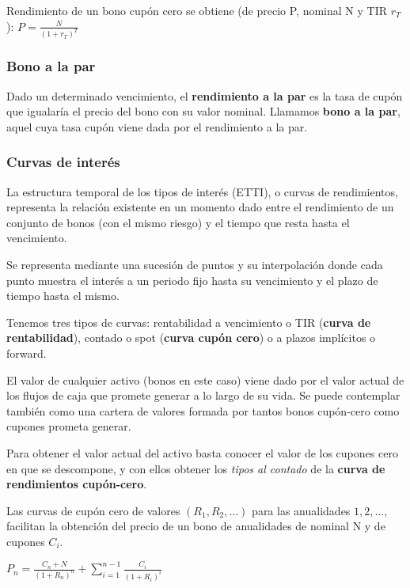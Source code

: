 \documentclass[
10pt, %
a4paper, %
oneside, %
headinclude,footinclude, %
BCOR5mm, %
]{scrartcl}
\newcommand{\n}[1]{\textbf{#1}}
\newcommand{\cur}[1]{\textit{#1}}
\newcommand{\sub}[1]{_{#1}}
\newcommand{\pot}[1]{^{#1}}
\newcommand{\f}[1]{{\large{${#1}$}}}
\newcommand{\sumatorio}[2]{\sum_{#1}^{#2}}
\newcounter{ex}
\begin{document}
		Rendimiento de un bono cupón cero se obtiene (de precio P, nominal N y TIR \f{r\sub{T}}): \f{P = \frac{N}{(1+r\sub{T})\pot{T}}}
		
		\subsubsection{Bono a la par}

		Dado un determinado vencimiento, el \n{rendimiento a la par} es la tasa de cupón que igualaría el precio del bono con su valor nominal. Llamamos \n{bono a la par}, aquel cuya tasa cupón viene dada por el rendimiento a la par.

		\subsubsection{Curvas de interés}

			La estructura temporal de los tipos de interés (ETTI), o curvas de rendimientos, representa la relación existente en un momento dado entre el rendimiento de un conjunto de bonos (con el mismo riesgo) y el tiempo que resta hasta el vencimiento.

			Se representa mediante una sucesión de puntos y su interpolación donde cada punto muestra el interés a un periodo fijo hasta su vencimiento y el plazo de tiempo hasta el mismo. 

			Tenemos tres tipos de curvas: rentabilidad a vencimiento o TIR (\n{curva de rentabilidad}), contado o spot (\n{curva cupón cero}) o a plazos implícitos o forward.
			

				El valor de cualquier activo (bonos en este caso) viene dado por el valor actual de los flujos de caja que promete generar a lo largo de su vida. Se puede contemplar también como una cartera de valores formada por tantos bonos cupón-cero como cupones prometa generar.

				Para obtener el valor actual del activo basta conocer el valor de los cupones cero en que se descompone, y con ellos obtener los \cur{tipos al contado} de la \n{curva de rendimientos cupón-cero}.

				Las curvas de cupón cero de valores \f{(R\sub{1}, R\sub{2},...)} para las anualidades \f{1,2,...}, facilitan la obtención del precio de un bono de anualidades de nominal N y de cupones \f{C\sub{i}}.
			\begin{center} \f{P\sub{n} = \frac{C\sub{n} + N}{(1+R\sub{n})\pot{n}} + \sumatorio{i=1}{n-1} \frac{C\sub{i}}{(1+R\sub{i})\pot{i}}} \end{center}
\end{document}
